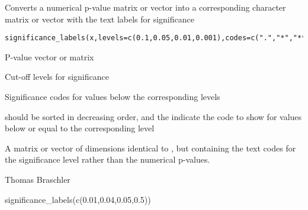 \documentclass[a4paper]{book}
\begin{document}
%
\begin{Description}\relax
Converts a numerical p-value matrix or vector into a corresponding character matrix or vector with the text labels for significance
\end{Description}
%
\begin{Usage}
\begin{verbatim}
significance_labels(x,levels=c(0.1,0.05,0.01,0.001),codes=c(".","*","**","***"))
\end{verbatim}
\end{Usage}
%
\begin{Arguments}
\begin{ldescription}
\item[\code{x}] 
P-value vector or matrix

\item[\code{levels}] 
Cut-off levels for significance

\item[\code{codes}] 
Significance codes for values below the corresponding levels

\end{ldescription}
\end{Arguments}
%
\begin{Details}\relax
{} should be sorted in decreasing order, and the  indicate the code to show for values below or equal to the corresponding level
\end{Details}
%
\begin{Value}
A matrix or vector of dimensions identical to , but containing the text codes for the significance level rather than the numerical p-values.
\end{Value}
%
\begin{Author}\relax
Thomas Braschler
\end{Author}
%
\begin{Examples}
\begin{ExampleCode}

significance_labels(c(0.01,0.04,0.05,0.5))
\end{ExampleCode}
\end{Examples}
\printindex{}
\end{document}
